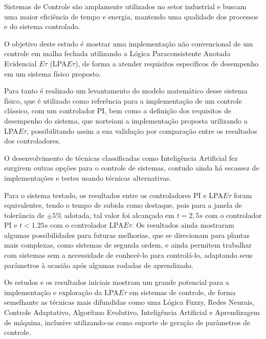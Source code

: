 





Sistemas de Controle são amplamente utilizados no setor industrial e
buscam uma maior eficiência de tempo e energia, mantendo uma qualidade
dos processos e do sistema controlado.

O objetivo deste estudo é mostrar uma implementação não convencional
de um controle em malha fechada utilizando a Lógica Paraconsistente
Anotada Evidencial $E\tau$ (LPA$E\tau$), de forma a atender requisitos específicos de desempenho em um sistema físico proposto.

Para tanto é realizado um levantamento do modelo matemático desse
sistema físico, que é utilizado como referência para a implementação de um
controle clássico, com um controlador PI, bem como a definição dos
requisitos de desempenho do sistema, que norteiam a implementação
proposta urilizando a LPA$E\tau$, possibilitando assim a sua validação
por comparação entre os resultados dos controladores. 

O desenvolvimento de técnicas classificadas como Inteligência
Artificial fez surgirem outras opções para o controle de sistemas,
contudo ainda há escassez de implementações e testes usando técnicas alternativas.

Para o sistema testado, os resultados entre os controladores PI e
LPA$E\tau$ foram equivalentes, tendo o tempo de subida como
destaque, pois para a janela de tolerância de $\pm 5\%$ adotada, tal
valor foi alcançado em $t=2,5s$ com o controlador PI e $t<1.25s$ com o
controlador LPA$E\tau$. Os resultados ainda mostraram algumas
possibilidades para futuras melhorias, que se direcionam para plantas
mais complexas, como sistemas de segunda ordem, e ainda permitem
trabalhar com sistemas sem a necessidade de conhecê-lo para
controlá-lo, adaptando seus parâmetros à ocasião após algumas
rodadas de aprendizado.

Os estudos e os resultados iniciais mostram um grande potencial para a
implementação e exploração da LPA$E\tau$ em sistemas de controle, de forma
semelhante as técnicas mais difundidas como uma Lógica Fuzzy, Redes
Neurais, Controle Adaptativo, Algorítmo Evolutivo, Inteligência
Artificial e Aprendizagem de máquina, inclusive
utilizando-as como suporte de geração de parâmetros de controle.


